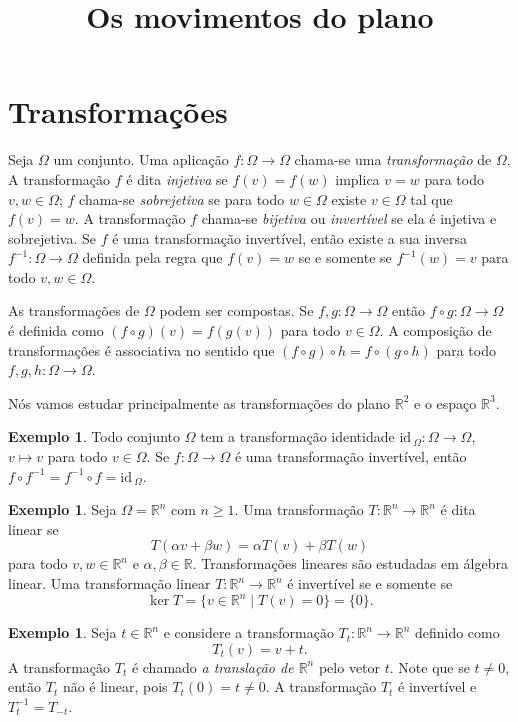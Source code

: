 \documentclass[12pt]{amsart}
\newcommand{\R}{\mathbb R}
\newcommand{\id}{\mbox{id}\,}
\theoremstyle{definition}
\newtheorem{example}[theorem]{Exemplo}
\begin{document}
\title{Os movimentos do plano}
\maketitle

\section{Transformações}

Seja $\Omega$ um conjunto. Uma aplicação $f:\Omega\to \Omega$ chama-se uma \emph{transformação} de $\Omega$. A transformação $f$ é dita \emph{injetiva} se $f(v)=f(w)$ implica $v=w$ para todo $v,w\in\Omega$;
$f$ chama-se \emph{sobrejetiva} se para todo $w\in\Omega$ existe $v\in\Omega$ tal que $f(v)=w$. A transformação
$f$ chama-se \emph{bijetiva} ou \emph{invertível} se ela é injetiva e sobrejetiva. Se $f$ é uma transformação 
invertível, então existe a sua inversa $f^{-1}:\Omega\to\Omega$ definida pela regra que 
$f(v)=w$ se e somente se $f^{-1}(w)=v$ para todo $v,w\in\Omega$.  

As transformações de $\Omega$ podem ser compostas. Se $f,g:\Omega\to \Omega$ então $f\circ g:\Omega\to \Omega$ 
é definida como $(f\circ g)(v)=f(g(v))$ para todo $v\in \Omega$. A composição de transformações é associativa no sentido que $(f\circ g)\circ h=f\circ(g\circ h)$ para todo $f,g,h:\Omega\to \Omega$. 

Nós vamos estudar principalmente as transformações do plano $\R^2$ e o espaço $\R^3$. 

\begin{example}
    Todo conjunto $\Omega$ tem a transformação identidade $\id_\Omega:\Omega\to \Omega$, $v\mapsto v$ 
    para todo $v\in\Omega$. Se $f:\Omega\to\Omega$ é uma transformação invertível, então 
    $f\circ f^{-1}=f^{-1}\circ f=\id_\Omega$. 
\end{example}

\begin{example}
    Seja $\Omega=\R^n$ com $n\geq 1$. Uma transformação $T:\R^n\to\R^n$ é dita linear se 
    \[
        T(\alpha v+\beta w)=\alpha T(v)+\beta T(w)
    \]
    para todo $v,w\in\R^n$ e $\alpha,\beta\in\R$. Transformações lineares são estudadas em álgebra linear.
    Uma transformação linear $T:\R^n\to \R^n$ é invertível se e somente se 
    \[
        \ker T=\{v\in \R^n\mid T(v)=0\}=\{0\}.
    \]
\end{example}

\begin{example}
    Seja $t\in\R^n$ e considere a transformação $T_t:\R^n\to \R^n$ definido como 
    \[
        T_t(v)=v+t.
    \]
    A transformação $T_t$ é chamado \emph{a translação de $\R^n$} pelo vetor $t$. Note que se 
    $t\neq 0$, então $T_t$ não é linear, pois $T_t(0)=t\neq 0$. A transformação $T_t$ é invertível e 
    $T_t^{-1}=T_{-t}$. 
\end{example}
\end{document}
